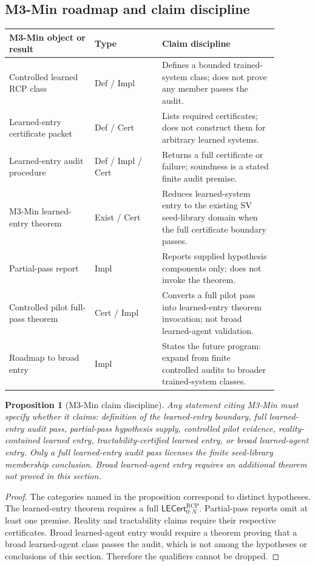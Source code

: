 \documentclass[11pt]{article}
\newtheorem{proposition}[theorem]{Proposition}
\newcommand{\1}{\mathbf{1}}
\newcommand{\RCP}{\mathrm{RCP}}
\begin{document}
\subsection{M3-Min roadmap and claim discipline}

\begin{longtable}{p{0.28\linewidth}p{0.22\linewidth}p{0.38\linewidth}}
\toprule
\textbf{M3-Min object or result} & \textbf{Type} & \textbf{Claim discipline}\\
\midrule
\endhead
\bottomrule
\endlastfoot
Controlled learned RCP class & Def / Impl & Defines a bounded trained-system class; does not prove any member passes the audit.\\
Learned-entry certificate packet & Def / Cert & Lists required certificates; does not construct them for arbitrary learned systems.\\
Learned-entry audit procedure & Def / Impl / Cert & Returns a full certificate or failure; soundness is a stated finite audit premise.\\
M3-Min learned-entry theorem & Exist / Cert & Reduces learned-system entry to the existing SV seed-library domain when the full certificate boundary passes.\\
Partial-pass report & Impl & Reports supplied hypothesis components only; does not invoke the theorem.\\
Controlled pilot full-pass theorem & Cert / Impl & Converts a full pilot pass into learned-entry theorem invocation; not broad learned-agent validation.\\
Roadmap to broad entry & Impl & States the future program: expand from finite controlled audits to broader trained-system classes.\\
\end{longtable}

\begin{proposition}[M3-Min claim discipline]
\label{prop:m3_min_claim_discipline}
Any statement citing M3-Min must specify whether it claims: definition of the learned-entry boundary, full learned-entry audit pass, partial-pass hypothesis supply, controlled pilot evidence, reality-contained learned entry, tractability-certified learned entry, or broad learned-agent entry.  Only a full learned-entry audit pass licenses the finite seed-library membership conclusion.  Broad learned-agent entry requires an additional theorem not proved in this section.
\end{proposition}

\begin{proof}
The categories named in the proposition correspond to distinct hypotheses.  The learned-entry theorem requires a full \(\mathsf{LECert}_{0:N}^{\RCP}\).  Partial-pass reports omit at least one premise.  Reality and tractability claims require their respective certificates.  Broad learned-agent entry would require a theorem proving that a broad learned-agent class passes the audit, which is not among the hypotheses or conclusions of this section.  Therefore the qualifiers cannot be dropped.
\end{proof}
\end{document}

